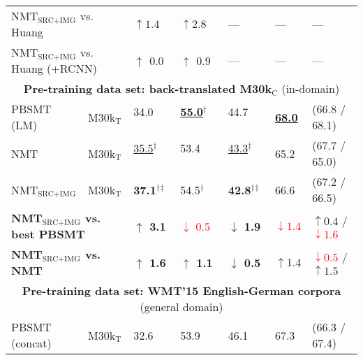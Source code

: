 \documentclass[11pt]{article}
\newcommand{\red}[1]{\textcolor{Red}{#1}}
\newcommand{\redbf}[1]{\textbf{\textcolor{Red}{#1}}}
\newcommand{\green}[1]{\textcolor{OliveGreen}{#1}}
\newcommand{\greenbf}[1]{\textbf{\textcolor{OliveGreen}{#1}}}
\newcommand{\whitebf}[1]{\textbf{\textcolor{White}{#1}}}
\begin{document}
\begin{table*}[t!]
{\begin{tabular}{lllllll}
    \multicolumn{2}{l}{NMT$_{\text{SRC+IMG}}$ vs. Huang} &
    \greenbf{$\uparrow 1.4$} &
    \greenbf{$\uparrow 2.8$} &
    --- & --- & --- \\
    
    \multicolumn{2}{l}{NMT$_{\text{SRC+IMG}}$ vs. Huang (+RCNN)} &
    \greenbf{$\uparrow$ $0.0$} &
    \greenbf{$\uparrow$ $0.9$} &
    --- & --- & --- \\
    \midrule
    
    \multicolumn{7}{c}{\textbf{Pre-training data set: back-translated M30k$_\text{C}$} (in-domain)}\\
    \midrule
     


PBSMT (LM) &
    M30k$_\text{T}$ &
    34.0 {\small \whitebf{$\uparrow0.0$}} &
    \textbf{\underline{55.0}}$^\dagger$ {\small \whitebf{$\uparrow0.0$}} &
    44.7 {\small \whitebf{$\uparrow0.0$}} &
    \textbf{\underline{68.0}} &
    (66.8 / 68.1) \\


NMT &
    M30k$_\text{T}$ &
    \underline{35.5}$^\ddagger$ {\small \whitebf{$\uparrow0.0$}} &
    53.4 {\small \whitebf{$\uparrow0.0$}} &
    \underline{43.3}$^\ddagger$ {\small \whitebf{$\uparrow0.0$}} &
    65.2 &
    (67.7 / 65.0) \\


NMT$_{\text{SRC+IMG}}$ &
    M30k$_\text{T}$ &
    \textbf{37.1}$^\dagger$$^\ddagger$ &
    54.5$^\dagger$\whitebf{$^\ddagger$} &
    \textbf{42.8}$^\dagger$$^\ddagger$ &
    66.6 &
    (67.2 / 66.5) \\
\midrule
    
    \multicolumn{2}{l}{\textbf{NMT$_{\text{SRC+IMG}}$ vs. best PBSMT}} &
    \greenbf{$\uparrow$ 3.1} &
    \red{$\downarrow$ 0.5} &
    \greenbf{$\downarrow$ 1.9} &
    \redbf{$\downarrow1.4$} & 
    \greenbf{$\uparrow0.4$} / \red{$\downarrow1.6$} \\
    
    \multicolumn{2}{l}{\textbf{NMT$_{\text{SRC+IMG}}$ vs. NMT}} &
    \greenbf{$\uparrow$ 1.6} &
    \greenbf{$\uparrow$ 1.1} &
    \greenbf{$\downarrow$ 0.5} &
    \greenbf{$\uparrow1.4$} &
    \red{$\downarrow0.5$} / \green{$\uparrow1.5$} \\
    
    \midrule
    \multicolumn{7}{c}{\textbf{Pre-training data set: WMT'15 English-German corpora} (general domain)}\\
    \midrule
    
PBSMT (concat) &
    M30k$_\text{T}$ &
    32.6 &
    53.9 &
    46.1 &
    67.3 &
    (66.3 / 67.4) \\



\end{tabular}}
\end{table*}
\end{document}
